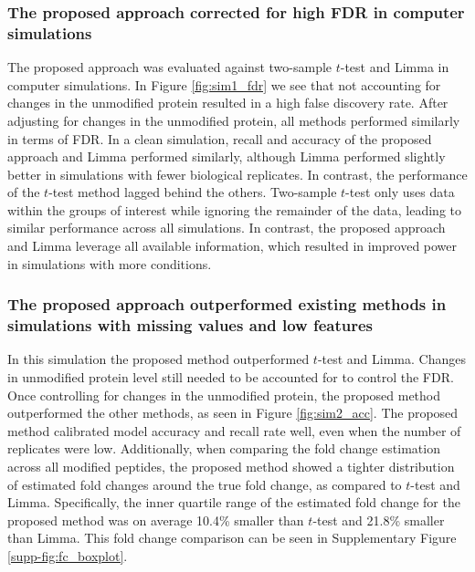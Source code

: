 \documentclass[mcp]{article}
\numberwithin{table}{section}
\begin{document}
\subsubsection*{The proposed approach corrected for high FDR in computer simulations}

The proposed approach was evaluated against two-sample $t$-test and Limma in computer simulations. 
In Figure \ref{fig:sim1_fdr} we see that not accounting for changes in the unmodified protein resulted in a high false discovery rate. After adjusting for changes in the unmodified protein, all methods performed similarly in terms of FDR. In a clean simulation, recall and accuracy of the proposed approach and Limma performed similarly, although Limma performed slightly better in simulations with fewer biological replicates. In contrast, the performance of the $t$-test method lagged behind the others. Two-sample $t$-test only uses data within the groups of interest while ignoring the remainder of the data, leading to similar performance across all simulations. In contrast, the proposed approach and Limma leverage all available information, which resulted in improved power in simulations with more conditions.

\subsubsection*{The proposed approach outperformed existing methods in simulations with missing values and low features}

In this simulation the proposed method outperformed $t$-test and Limma. Changes in unmodified protein level still needed to be accounted for to control the FDR. Once controlling for changes in the unmodified protein, the proposed method outperformed the other methods, as seen in Figure \ref{fig:sim2_acc}. The proposed method calibrated model accuracy and recall rate well, even when the number of replicates were low. Additionally, when comparing the fold change estimation across all modified peptides, the proposed method showed a tighter distribution of estimated fold changes around the true fold change, as compared to $t$-test and Limma. Specifically, the inner quartile range of the estimated fold change for the proposed method was on average 10.4\% smaller than $t$-test and 21.8\% smaller than Limma. This fold change comparison can be seen in Supplementary Figure \ref{supp-fig:fc_boxplot}.
\end{document}
